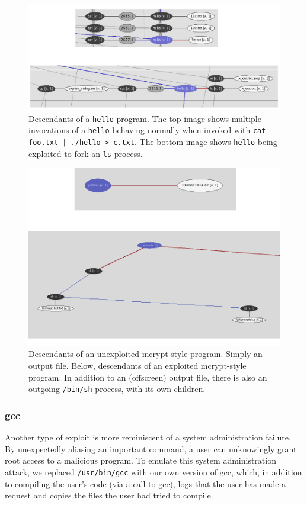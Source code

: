 \documentclass[10pt,twocolumn]{article}
\begin{document}
\begin{figure}
  \label{hello-orbiter}
  \caption{Descendants of a \texttt{hello} program. The top image shows multiple invocations of a \texttt{hello} behaving normally when invoked with \texttt{cat foo.txt | ./hello > c.txt}. The bottom image shows \texttt{hello} being exploited to fork an \texttt{ls} process.} 
  \centering
    \includegraphics[width=\textwidth]{img/hello.png}
\end{figure}
\begin{figure}
  \label{mcrypt-orbiter}
  \caption{Descendants of an unexploited mcrypt-style program. Simply an output file. Below, descendants of an exploited mcrypt-style program. In addition to an (offscreen) output file, there is also an outgoing \texttt{/bin/sh} process, with its own children.}
  \centering
    \includegraphics[width=\textwidth]{img/mcrypt.png}
\end{figure}

\subsubsection{gcc}
Another type of exploit is more reminiscent of a system administration failure. By unexpectedly aliasing an important command, a user can unknowingly grant root access to a malicious program. To emulate this system administration attack, we replaced \texttt{/usr/bin/gcc} with our own version of gcc, which, in addition to compiling the user's code (via a call to gcc), logs that the user has made a request and copies the files the user had tried to compile. 
\end{document}
